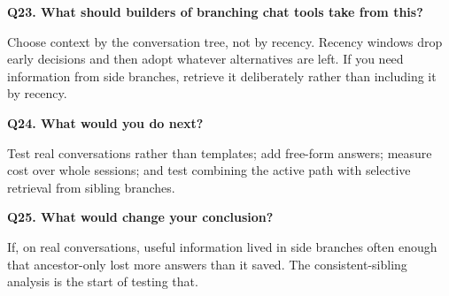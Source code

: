 \textbf{Q23. What should builders of branching chat tools take from this?}\par
Choose context by the conversation tree, not by recency. Recency windows drop early decisions and then adopt whatever alternatives are left. If you need information from side branches, retrieve it deliberately rather than including it by recency.

\textbf{Q24. What would you do next?}\par
Test real conversations rather than templates; add free-form answers; measure cost over whole sessions; and test combining the active path with selective retrieval from sibling branches.

\textbf{Q25. What would change your conclusion?}\par
If, on real conversations, useful information lived in side branches often enough that ancestor-only lost more answers than it saved. The consistent-sibling analysis is the start of testing that.
